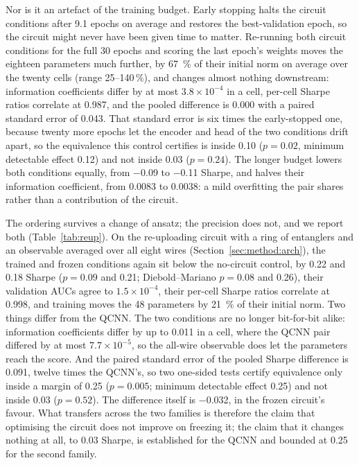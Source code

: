 Nor is it an artefact of the training budget. Early stopping halts the
circuit conditions after \num{9.1} epochs on average and restores the
best-validation epoch, so the circuit might never have been given time to
matter. Re-running both circuit conditions for the full \num{30} epochs
and scoring the last epoch's weights moves the eighteen parameters much
further, by \SI{67}{\percent} of their initial norm on average over the twenty
cells (range \numrange{25}{140}\,\si{\percent}), and changes almost nothing
downstream: information coefficients differ by at most $3.8\times10^{-4}$ in a
cell, per-cell Sharpe ratios correlate at \num{0.987}, and the pooled
difference is \num{0.000} with a paired standard error of \num{0.043}. That
standard error is six times the early-stopped one, because twenty more epochs
let the encoder and head of the two conditions drift apart, so the
equivalence this control certifies is inside \num{0.10} ($p = 0.02$, minimum
detectable effect \num{0.12}) and not inside \num{0.03} ($p = 0.24$). The
longer budget lowers both conditions equally, from \num{-0.09} to \num{-0.11}
Sharpe, and halves their information coefficient, from \num{0.0083} to
\num{0.0038}: a mild overfitting the pair shares rather than a contribution of
the circuit.

The ordering survives a change of ansatz; the precision does not, and we
report both (Table~\ref{tab:reup}). On the re-uploading circuit with a ring of
entanglers and an observable averaged over all eight wires (Section~\ref{sec:method:arch}), the
trained and frozen conditions again sit below the no-circuit control, by
\num{0.22} and \num{0.18} Sharpe ($p = 0.09$ and \num{0.21}; Diebold--Mariano
$p = 0.08$ and \num{0.26}), their validation AUCs agree to $1.5\times10^{-4}$, their
per-cell Sharpe ratios correlate at \num{0.998}, and training moves the
\num{48} parameters by \SI{21}{\percent} of their initial norm. Two things
differ from the QCNN. The two conditions are no longer bit-for-bit alike:
information coefficients differ by up to \num{0.011} in a cell, where the QCNN
pair differed by at most $7.7\times10^{-5}$, so the all-wire observable does let the
parameters reach the score. And the paired standard error of the pooled
Sharpe difference is \num{0.091}, twelve times the QCNN's, so two one-sided
tests certify equivalence only inside a margin of \num{0.25} ($p = 0.005$;
minimum detectable effect \num{0.25}) and not inside \num{0.03}
($p = 0.52$). The difference itself is \num{-0.032}, in the frozen circuit's
favour. What transfers across the two families is therefore the claim that
optimising the circuit does not improve on freezing it; the claim that it
changes nothing at all, to \num{0.03} Sharpe, is established for the QCNN
and bounded at \num{0.25} for the second family.


